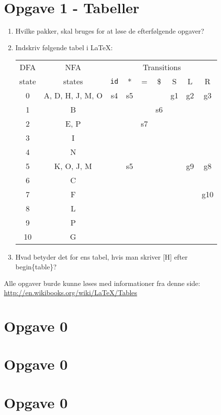 \documentclass[12pt]{article}
\begin{document}
\section{Opgave 1 - Tabeller}
	\begin{enumerate}
  		\item Hvilke pakker, skal bruges for at løse de efterfølgende opgaver?
  		\item Indskriv følgende tabel i \LaTeX{}:
\begin{table}[H]
\center
\begin{tabular}{c| c| c c c c| c c c}
DFA & NFA & \multicolumn{7}{c}{Transitions} \\
state & states & \texttt{id} & * & = & \$ & S & L & R \\
\hline
0 & A, D, H, J, M, O 	& s4 	& s5 	&     	&      	& g1 	& g2 	& g3\\
1 & B                       	&      &      	&     	& s6 	&      	&      	& \\
2 & E, P                   	&      &     	& s7 	&      	&     	&      	& \\
3 & I                         	&     	&    	&      	&      	&     	&      	& \\
4 & N                       	& 	&     	&      	&      	&     	&      	& \\
5 & K, O, J, M		& 	& s5	& 	& 	& 	& g9	& g8\\
6 & C			& 	& 	&	&	&	&	& \\
7 & F			&	&	&	&	&	&	& g10\\
8 & L				& 	& 	&	&	&	&	& \\
9 & P			& 	& 	&	&	&	&	& \\
10 & G 			& 	& 	&	&	&	&	& \\
\end{tabular}
\end{table}

 		\item Hvad betyder det for ens tabel, hvis man skriver [H] efter \\begin\{table\}?
	\end{enumerate}

Alle opgaver burde kunne løses med informationer fra denne side:\\
\url{http://en.wikibooks.org/wiki/LaTeX/Tables}

\newpage
\section{Opgave 0}

\section{Opgave 0}

\section{Opgave 0}
	
%
%
%


\end{document}
